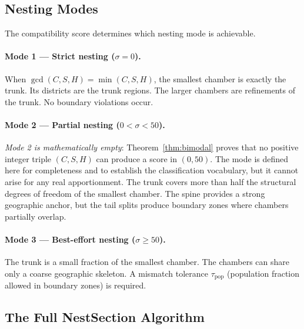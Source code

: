 \subsection{Nesting Modes}

The compatibility score determines which nesting mode is achievable.

\paragraph{Mode 1 --- Strict nesting ($\sigma = 0$).}
When $\gcd(C,S,H) = \min(C,S,H)$, the smallest chamber is exactly the trunk.
Its districts are the trunk regions.  The larger chambers are refinements of
the trunk.  No boundary violations occur.

\paragraph{Mode 2 --- Partial nesting ($0 < \sigma < 50$).}
\emph{Mode 2 is mathematically empty}: Theorem~\ref{thm:bimodal} proves that
no positive integer triple $(C, S, H)$ can produce a score in $(0, 50)$.
The mode is defined here for completeness and to establish the classification
vocabulary, but it cannot arise for any real apportionment.
The trunk covers more than half the structural degrees of freedom of the
smallest chamber.  The spine provides a strong geographic anchor, but the
tail splits produce boundary zones where chambers partially overlap.

\paragraph{Mode 3 --- Best-effort nesting ($\sigma \geq 50$).}
The trunk is a small fraction of the smallest chamber.  The chambers can
share only a coarse geographic skeleton.  A mismatch tolerance $\tau_\text{pop}$
(population fraction allowed in boundary zones) is required.

\subsection{The Full NestSection Algorithm}

